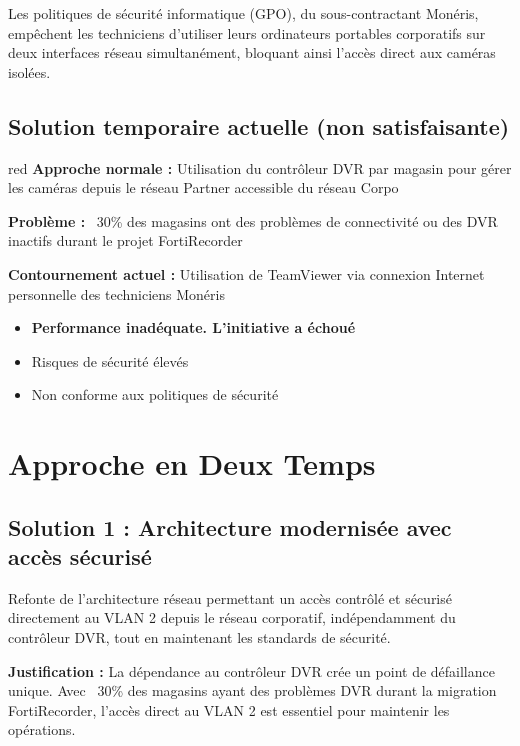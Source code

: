 \documentclass{dollarama}
\begin{document}
Les politiques de sécurité informatique (GPO), du sous-contractant Monéris, empêchent les techniciens d'utiliser leurs ordinateurs portables corporatifs sur deux interfaces réseau simultanément, bloquant ainsi l'accès direct aux caméras isolées.

\subsection{Solution temporaire actuelle (non satisfaisante)}

\begin{dollaramariskcategory}{red}{}
\textbf{Approche normale :} Utilisation du contrôleur DVR par magasin pour gérer les caméras depuis le réseau Partner accessible du réseau Corpo

\textbf{Problème :} ~30\% des magasins ont des problèmes de connectivité ou des DVR inactifs durant le projet FortiRecorder

\textbf{Contournement actuel :} Utilisation de TeamViewer via connexion Internet personnelle des techniciens Monéris
\begin{itemize}
\item \textbf{Performance inadéquate. L'initiative a échoué}
\item Risques de sécurité élevés
\item Non conforme aux politiques de sécurité
\end{itemize}
\end{dollaramariskcategory}


\section{Approche en Deux Temps}

\subsection{Solution 1 : Architecture modernisée avec accès sécurisé}

Refonte de l'architecture réseau permettant un accès contrôlé et sécurisé directement au VLAN 2 depuis le réseau corporatif, indépendamment du contrôleur DVR, tout en maintenant les standards de sécurité.

\textbf{Justification :} La dépendance au contrôleur DVR crée un point de défaillance unique. Avec ~30\% des magasins ayant des problèmes DVR durant la migration FortiRecorder, l'accès direct au VLAN 2 est essentiel pour maintenir les opérations.
\end{document}

